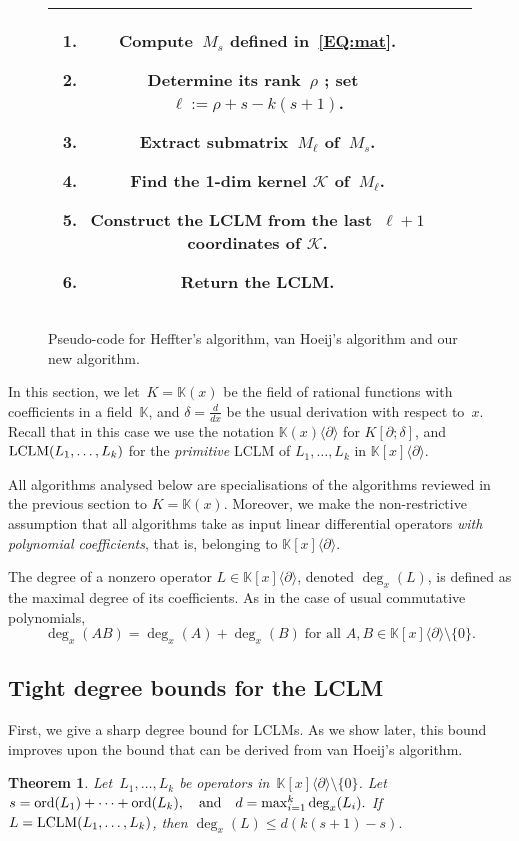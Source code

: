 \documentclass{sig-alt-full}
\def\K {\ensuremath{\mathbb{K}}}
\newcommand{\x}{x}
\newcommand{\Dx}{\partial}
\newcommand{\pa} { \partial}
\newcommand{\ord} { {\rm ord}}
\newcommand{\lclm} { {\rm LCLM}}
\newtheorem{theorem}{Theorem}
\begin{document}
\begin{figure*}
\begin{center}
\begin{tabular}{|c|c|c|}
{\begin{minipage}{5.3cm}
		\medskip
		\center{\bf Our new algorithm}

		\medskip
		\begin{enumerate}
		\item Compute~$M_s$ defined in~\eqref{EQ:mat}. 
		\item Determine  its rank~$\rho$ ; set~$\ell := \rho + s - k(s+1)$.\label{step:rankNew}\item Extract submatrix~$M_\ell$ of~$M_s$.
		\item Find the 1-dim kernel $\mathcal{K}$ of~$M_\ell$.\label{step:kernelNew}
		\item Construct the LCLM from the last~$\ell+1$ coordinates of $\mathcal{K}$.
		\item Return the LCLM.
		\end{enumerate}
		\end{minipage}
} \\ 
\hline
\end{tabular}
\caption{Pseudo-code for Heffter's algorithm, van Hoeij's algorithm and our new algorithm.}
\label{fig:Heffter+vH+new}
\end{center}
\end{figure*}



In this section, we let~$K = \K(x)$ be the field of rational functions with
coefficients in a field~$\K$, and $\delta = \frac{d}{dx}$ be the usual
derivation with respect to~$x$. Recall that in this case we use the notation
$\K(\x)\langle \Dx\rangle$ for $K[\pa ; \delta]$, and $\lclm(L_1,\ldots,L_k)$
for the \emph{primitive\/} LCLM of $L_1,\ldots,L_k$ in  $\K[\x]\langle \Dx\rangle$.

All algorithms analysed below are specialisations of the algorithms reviewed
in the previous section to $K = \K(x)$. Moreover,  we make the non-restrictive assumption that all algorithms take as input linear differential operators
\emph{with polynomial coefficients}, that is, belonging to $\K[x]\langle
\Dx\rangle$.

The degree of a nonzero operator $L \in \K[\x]\langle \Dx\rangle$, denoted $\deg_x(L)$,
is defined as the maximal degree of its coefficients.
As in the case of usual commutative polynomials,
\[ \deg_x (AB) = \deg_x (A) + \deg_x (B) \; \mbox{for all~$A, B \in \K[\x]\langle \Dx\rangle \setminus \{ 0 \}.$} \]

\subsection{Tight degree bounds for the LCLM}
First, we give a sharp degree bound for LCLMs. As we show later, this bound improves upon the bound that can be derived from van Hoeij's algorithm.
\begin{theorem} \label{TH:db}
Let~$L_1, \!\ldots \!, \! L_k$ be operators in~$\K[\x]\langle \Dx\rangle \setminus \{ 0\}$. Let
$ s= \ord(L_1) + \cdots+ \ord(L_k), \quad \textrm{and} \quad d = \max_{i=1}^k \deg_x (L_i).$
If~$L=\lclm(L_1, \ldots, L_k)$, then
$ \deg_x (L) \le d (k(s+1)-s). $
\end{theorem}
\end{document}
